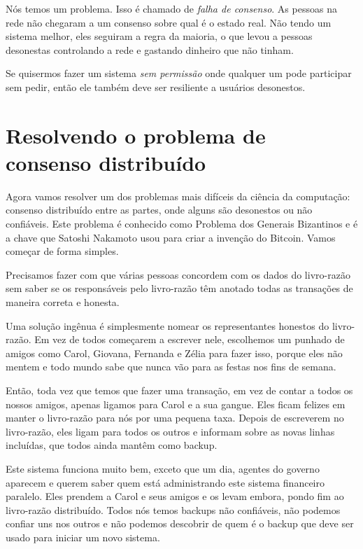 Nós temos um problema. Isso é chamado de \textit{falha de consenso}. As pessoas na rede não chegaram a um consenso sobre qual é o estado real. Não tendo um sistema melhor, eles seguiram a regra da maioria, o que levou a pessoas desonestas controlando a rede e gastando dinheiro que não tinham.

Se quisermos fazer um sistema \textit{sem permissão} onde qualquer um pode participar sem pedir, então ele também deve ser resiliente a usuários desonestos.

\section*{Resolvendo o problema de consenso distribuído}
Agora vamos resolver um dos problemas mais difíceis da ciência da computação: consenso distribuído entre as partes, onde alguns são desonestos ou não confiáveis. Este problema é conhecido como Problema dos Generais Bizantinos e é a chave que Satoshi Nakamoto usou para criar a invenção do Bitcoin. Vamos começar de forma simples.

Precisamos fazer com que várias pessoas concordem com os dados do livro-razão sem saber se os  responsáveis pelo livro-razão têm anotado todas as transações de maneira correta e honesta.

Uma solução ingênua é simplesmente nomear os representantes honestos do livro-razão. Em vez de todos começarem a escrever nele, escolhemos um punhado de amigos como Carol, Giovana, Fernanda e Zélia para fazer isso, porque eles não mentem e todo mundo sabe que nunca vão para as festas nos fins de semana.

Então, toda vez que temos que fazer uma transação, em vez de contar a todos os nossos amigos, apenas ligamos para Carol e a sua gangue. Eles ficam felizes em manter o livro-razão para nós por uma pequena taxa. Depois de escreverem no livro-razão, eles ligam para todos os outros e informam sobre as novas linhas incluídas, que todos ainda mantêm como backup.

Este sistema funciona muito bem, exceto que um dia, agentes do governo aparecem e querem saber quem está administrando este sistema financeiro paralelo. Eles prendem a Carol e seus amigos e os levam embora, pondo fim ao livro-razão distribuído. Todos nós temos backups não confiáveis, não podemos confiar uns nos outros e não podemos descobrir de quem é o backup que deve ser usado para iniciar um novo sistema.

